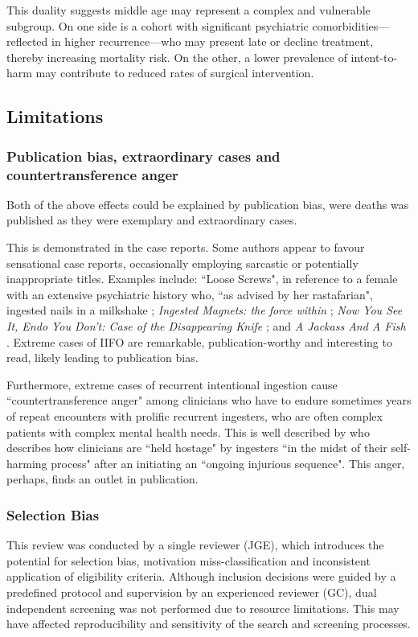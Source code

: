 \documentclass[pdflatex,sn-basic,Numbered]{sn-jnl}
\begin{document}
This duality suggests middle age may represent a complex and vulnerable subgroup. On one side is a cohort with significant psychiatric comorbidities—reflected in higher recurrence—who may present late or decline treatment, thereby increasing mortality risk. On the other, a lower prevalence of intent-to-harm may contribute to reduced rates of surgical intervention.

\subsection{Limitations}

\subsubsection{Publication bias, extraordinary cases and countertransference anger}
Both of the above effects could be explained by publication bias, were deaths was published as they were exemplary and extraordinary cases. 

This is demonstrated in the case reports. Some authors appear to favour sensational case reports, occasionally employing sarcastic or potentially inappropriate titles. Examples include: ``Loose Screws", in reference to a female with an extensive psychiatric history who, ``as advised by her rastafarian", ingested nails in a milkshake \cite{Hardy_2023g}; \textit{Ingested Magnets: the force within} \cite{Tay_2004}; \textit{Now You See It, Endo You Don't: Case of the Disappearing Knife} \cite{Fine_2013}; and \textit{A Jackass And A Fish} \cite{Benoist_2019e}. Extreme cases of IIFO are remarkable, publication-worthy and interesting to read, likely leading to publication bias.

Furthermore, extreme cases of recurrent intentional ingestion cause ``countertransference anger" \cite{Palese_2012} among clinicians who have to endure sometimes years of repeat encounters with prolific recurrent ingesters, who are often complex patients with complex mental health needs. This is well described by \citet{Gitlin_2007} who describes how clinicians are ``held hostage" by ingesters ``in the midst of their self-harming process" after an initiating an ``ongoing injurious sequence". This anger, perhaps, finds an outlet in publication.

\subsubsection{Selection Bias}
This review was conducted by a single reviewer (JGE), which introduces the potential for selection bias, motivation miss-classification and inconsistent application of eligibility criteria. Although inclusion decisions were guided by a predefined protocol and supervision by an experienced reviewer (GC), dual independent screening was not performed due to resource limitations. This may have affected reproducibility and sensitivity of the search and screening processes.
\end{document}
